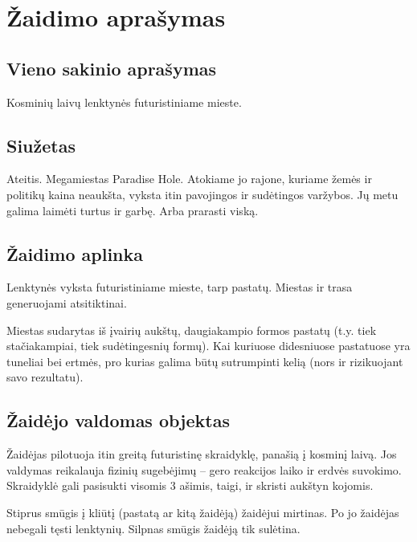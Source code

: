 \section{Žaidimo aprašymas}
\subsection{Vieno sakinio aprašymas}


Kosminių laivų lenktynės futuristiniame mieste.


\subsection{Siužetas}

Ateitis.
Megamiestas Paradise Hole.
Atokiame jo rajone, kuriame žemės ir politikų kaina neaukšta, vyksta itin pavojingos ir sudėtingos varžybos.
Jų metu galima laimėti turtus ir garbę.
Arba prarasti viską.

\subsection{Žaidimo aplinka}

Lenktynės vyksta futuristiniame mieste, tarp pastatų.
Miestas ir trasa generuojami atsitiktinai.

Miestas sudarytas iš įvairių aukštų, daugiakampio formos pastatų (t.y. tiek stačiakampiai, tiek sudėtingesnių formų).
Kai kuriuose didesniuose pastatuose yra tuneliai bei ertmės, pro kurias galima būtų sutrumpinti kelią (nors ir rizikuojant savo rezultatu).

\subsection{Žaidėjo valdomas objektas}

Žaidėjas pilotuoja itin greitą futuristinę skraidyklę, panašią į kosminį laivą.
Jos valdymas reikalauja fizinių sugebėjimų -- gero reakcijos laiko ir erdvės suvokimo.
Skraidyklė gali pasisukti visomis 3 ašimis, taigi, ir skristi aukštyn kojomis.

Stiprus smūgis į kliūtį (pastatą ar kitą žaidėją) žaidėjui mirtinas.
Po jo žaidėjas nebegali tęsti lenktynių.
Silpnas smūgis žaidėją tik sulėtina.
